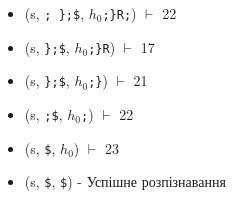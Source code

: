 \begin{itemize}
    \item[]  (s, \quad \verb|; };$|,                              \quad $h_{0}$\verb|;}R;|)         $\vdash$ 22
    \item[]  (s, \quad \verb|};$|,                                \quad $h_{0}$\verb|;}R|)          $\vdash$ 17
    \item[]  (s, \quad \verb|};$|,                                \quad $h_{0}$\verb|;}|)           $\vdash$ 21
    \item[]  (s, \quad \verb|;$|,                                 \quad $h_{0}$\verb|;|)            $\vdash$ 22
    \item[]  (s, \quad \verb|$|,                                  \quad $h_{0}$)                    $\vdash$ 23
    \item[]  (s, \quad \verb|$|,                                  \quad \verb|$|) - Успішне розпізнавання
\end{itemize}

